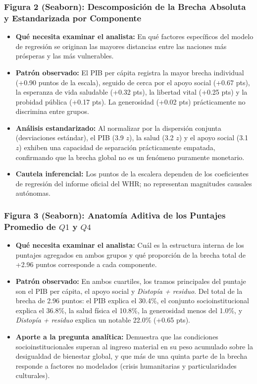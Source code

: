 \documentclass[11pt]{article}
\begin{document}
\subsubsection{Figura 2 (Seaborn): Descomposición de la Brecha Absoluta y Estandarizada por Componente}
\begin{itemize}
    \item \textbf{Qué necesita examinar el analista:} En qué factores específicos del modelo de regresión se originan las mayores distancias entre las naciones más prósperas y las más vulnerables.
    \item \textbf{Patrón observado:} El PIB per cápita registra la mayor brecha individual (+0.90 puntos de la escala), seguido de cerca por el apoyo social (+0.67 pts), la esperanza de vida saludable (+0.32 pts), la libertad vital (+0.25 pts) y la probidad pública (+0.17 pts). La generosidad (+0.02 pts) prácticamente no discrimina entre grupos.
    \item \textbf{Análisis estandarizado:} Al normalizar por la dispersión conjunta (desviaciones estándar), el PIB (3.9 $z$), la salud (3.2 $z$) y el apoyo social (3.1 $z$) exhiben una capacidad de separación prácticamente empatada, confirmando que la brecha global no es un fenómeno puramente monetario.
    \item \textbf{Cautela inferencial:} Los puntos de la escalera dependen de los coeficientes de regresión del informe oficial del WHR; no representan magnitudes causales autónomas.
\end{itemize}

\subsubsection{Figura 3 (Seaborn): Anatomía Aditiva de los Puntajes Promedio de $Q1$ y $Q4$}
\begin{itemize}
    \item \textbf{Qué necesita examinar el analista:} Cuál es la estructura interna de los puntajes agregados en ambos grupos y qué proporción de la brecha total de +2.96 puntos corresponde a cada componente.
    \item \textbf{Patrón observado:} En ambos cuartiles, los tramos principales del puntaje son el PIB per cápita, el apoyo social y \textit{Distopía + residuo}. Del total de la brecha de 2.96 puntos: el PIB explica el 30.4\%, el conjunto socioinstitucional explica el 36.8\%, la salud física el 10.8\%, la generosidad menos del 1.0\%, y \textit{Distopía + residuo} explica un notable 22.0\% (+0.65 pts).
    \item \textbf{Aporte a la pregunta analítica:} Demuestra que las condiciones socioinstitucionales superan al ingreso material en su peso acumulado sobre la desigualdad de bienestar global, y que más de una quinta parte de la brecha responde a factores no modelados (crisis humanitarias y particularidades culturales).
\end{itemize}
\end{document}
